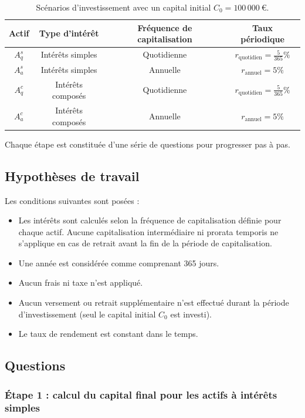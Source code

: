 \documentclass{article}
\begin{document}
\begin{table}[h!]
\centering
\begin{tabular}{|c|c|c|c|}
\hline
\textbf{Actif} & \textbf{Type d'intérêt} & \textbf{Fréquence de capitalisation} & \textbf{Taux périodique} \\
\hline
\(A_q^s\) & Intérêts simples & Quotidienne & \(r_\text{quotidien} = \frac{5}{365}\%\) \\
\hline
\(A_a^s\) & Intérêts simples & Annuelle & \(r_\text{annuel} = 5\%\) \\
\hline
\(A_q^c\) & Intérêts composés & Quotidienne & \(r_\text{quotidien} = \frac{5}{365}\%\) \\
\hline
\(A_a^c\) & Intérêts composés & Annuelle & \(r_\text{annuel} = 5\%\) \\
\hline
\end{tabular}
\caption{Scénarios d'investissement avec un capital initial \(C_0 = 100\,000\ \text{€}\).}
\label{tab:scenarios}
\end{table}

Chaque étape est constituée d'une série de questions pour progresser pas à pas.

\subsection{Hypothèses de travail}
Les conditions suivantes sont posées :
\begin{itemize}
    \item Les intérêts sont calculés selon la fréquence de capitalisation définie pour chaque actif. Aucune capitalisation intermédiaire ni prorata temporis ne s'applique en cas de retrait avant la fin de la période de capitalisation.
    \item Une année est considérée comme comprenant 365 jours.
    \item Aucun frais ni taxe n'est appliqué.
    \item Aucun versement ou retrait supplémentaire n’est effectué durant la période d'investissement (seul le capital initial \( C_0 \) est investi).
    \item Le taux de rendement est constant dans le temps.
\end{itemize}

\subsection{Questions}
\subsubsection*{Étape 1 : calcul du capital final pour les actifs à intérêts simples}
\end{document}
